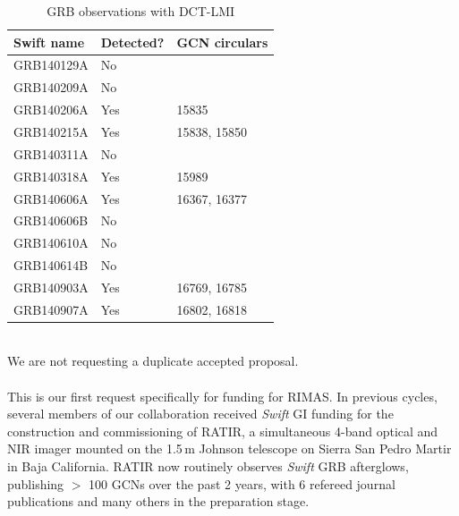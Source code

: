 \documentclass[letterpaper,11pt]{article}
\begin{document}
	\begin{table}[ht]
		\centering 
		\begin{tabular}{lll}
			\hline\hline
			\textbf{Swift name} & \textbf{Detected?} & \textbf{GCN circulars}		\\
			\hline
			GRB140129A			& No					&							\\
			GRB140209A			& No					&							\\
			GRB140206A			& Yes					& 15835						\\
			GRB140215A			& Yes					& 15838, 15850				\\
			GRB140311A			& No					&							\\
			GRB140318A			& Yes					& 15989						\\
			GRB140606A			& Yes					& 16367, 16377				\\
			GRB140606B			& No					&							\\
			GRB140610A			& No					&							\\
			GRB140614B			& No					&							\\
			GRB140903A			& Yes					& 16769, 16785				\\
			GRB140907A			& Yes					& 16802, 16818				\\
			\hline
		\end{tabular}
		\caption{GRB observations with DCT-LMI}
		\label{table:DCTobs} 
	\end{table}

\smallskip\\
We are not requesting a duplicate accepted proposal.\\

\smallskip\\
This is our first request specifically for funding for RIMAS.  In previous cycles,
several members of our collaboration received \textit{Swift} GI funding for the 
construction and commissioning of RATIR, a simultaneous 4-band optical and NIR
imager mounted on the 1.5\,m Johnson telescope on Sierra San Pedro Martir in Baja 
California.  RATIR now routinely observes \textit{Swift} GRB afterglows, publishing
$>$ 100 GCNs over the past 2 years, with 6 refereed journal publications and 
many others in the preparation stage. \\
\end{document}

